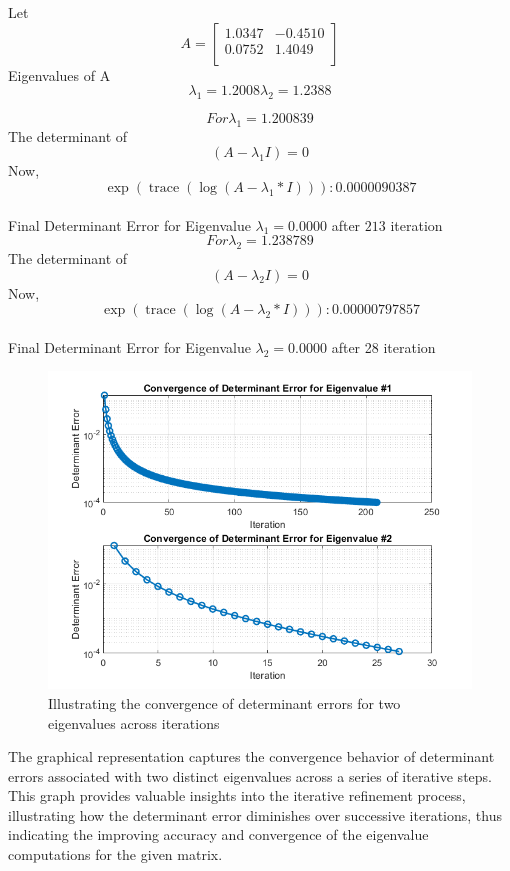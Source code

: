 \begin{example}


Let
\[A=
\begin{bmatrix}
1.0347 & -0.4510 \\
0.0752 & 1.4049 \\
\end{bmatrix}
\]
Eigenvalues of A
 $$  \lambda_1 = 1.2008
   \lambda_2 = 1.2388 $$

$$ For \lambda_1 = 1.200839 $$
The determinant of $$(A - \lambda_1 I)= 0$$
Now,
$$\exp(\operatorname{trace}(\log (A -\lambda_1 *I ))): 0.0000090387$$ \\
Final Determinant Error for Eigenvalue $\lambda_1 = 0.0000$ after $213$ iteration \\
$$ For \lambda_2 = 1.238789 $$
The determinant of $$(A - \lambda_2 I)= 0$$
Now,
$$\exp(\operatorname{trace}(\log (A -\lambda_2 *I ))): 0.00000797857$$ \\
Final Determinant Error for Eigenvalue $\lambda_2 = 0.0000$ after 28 iteration 
\end{example}
\begin{center}
    \begin{figure}
        \centering
        \includegraphics[width=0.8\linewidth]{Figures/eigen_value_exact.png}
        \caption{Illustrating the convergence of determinant errors for two eigenvalues across iterations}
        \label{fig:enter-label}
    \end{figure}
\end{center}

\newpage
The graphical representation captures the convergence behavior of determinant errors associated with two distinct eigenvalues across a series of iterative steps.  This graph provides valuable insights into the iterative refinement process, illustrating how the determinant error diminishes over successive iterations, thus indicating the improving accuracy and convergence of the eigenvalue computations for the given matrix.